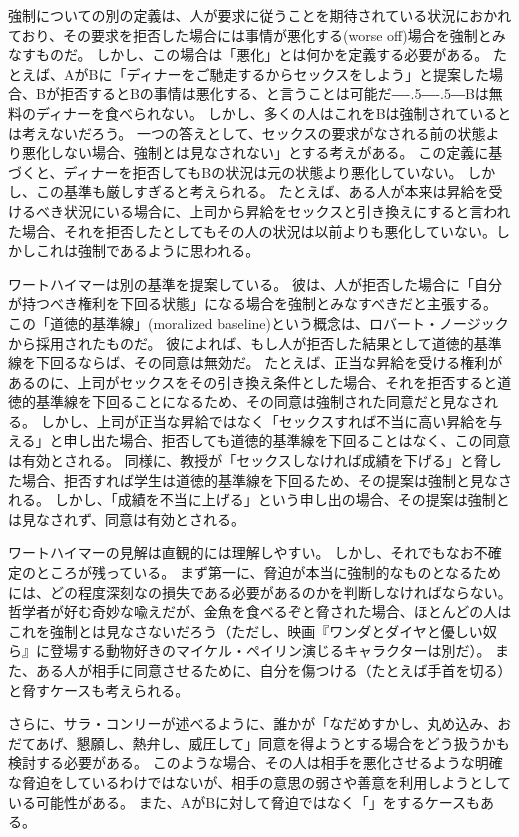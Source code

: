 \documentclass[paper=a4,book,openany]{jlreq}
\newcommand{\ig}[1]{}           %
\def\DDASH{―\kern-.5\zw―\kern-.5\zw―}
\begin{document}
強制についての別の定義は、人が要求に従うことを期待されている状況におかれており、その要求を拒否した場合には事情が悪化する(worse off)場合を強制とみなすものだ。
しかし、この場合は「悪化」とは何かを定義する必要がある。
たとえば、AがBに「ディナーをご馳走するからセックスをしよう」と提案した場合、Bが拒否するとBの事情は悪化する、と言うことは可能だ{\DDASH}Bは無料のディナーを食べられない。
しかし、多くの人はこれをBは強制されているとは考えないだろう。
一つの答えとして、セックスの要求がなされる前の状態より悪化しない場合、強制とは見なされない」とする考えがある。
この定義に基づくと、ディナーを拒否してもBの状況は元の状態より悪化していない。
しかし、この基準も厳しすぎると考えられる。
たとえば、ある人が本来は昇給を受けるべき状況にいる場合に、上司から昇給をセックスと引き換えにすると言われた場合、それを拒否したとしてもその人の状況は以前よりも悪化していない。しかしこれは強制であるように思われる。

ワートハイマーは別の基準を提案している。
彼は、人が拒否した場合に「自分が持つべき権利を下回る状態」になる場合を強制とみなすべきだと主張する。
この「道徳的基準線」(moralized baseline)という概念は、ロバート・ノージック\ig{Robert Nozick}から採用されたものだ。
彼によれば、もし人が拒否した結果として道徳的基準線を下回るならば、その同意は無効だ\citep[pp. 167--169]{wertheimer03:_consen_sexual_relat}。
たとえば、正当な昇給を受ける権利があるのに、上司がセックスをその引き換え条件とした場合、それを拒否すると道徳的基準線を下回ることになるため、その同意は強制された同意だと見なされる。
しかし、上司が正当な昇給ではなく「セックスすれば不当に高い昇給を与える」と申し出た場合、拒否しても道徳的基準線を下回ることはなく、この同意は有効とされる。
同様に、教授が「セックスしなければ成績を下げる」と脅した場合、拒否すれば学生は道徳的基準線を下回るため、その提案は強制と見なされる。
しかし、「成績を不当に上げる」という申し出の場合、その提案は強制とは見なされず、同意は有効とされる。

ワートハイマーの見解は直観的には理解しやすい。
しかし、それでもなお不確定のところが残っている。
まず第一に、脅迫が本当に強制的なものとなるためには、どの程度深刻なの損失である必要があるのかを判断しなければならない。
哲学者が好む奇妙な喩えだが、金魚を食べるぞと脅された場合、ほとんどの人はこれを強制とは見なさないだろう（ただし、映画『ワンダとダイヤと優しい奴ら』に登場する動物好きのマイケル・ペイリン演じるキャラクターは別だ）。
また、ある人が相手に同意させるために、自分を傷つける（たとえば手首を切る）と脅すケースも考えられる\citep[p.280]{husak06:_compl_guide_consen_sex}。

さらに、サラ・コンリーが述べるように、誰かが「なだめすかし、丸め込み、おだてあげ、懇願し、熱弁し、威圧して」同意を得ようとする場合をどう扱うかも検討する必要がある\citep[p.115]{conly04:seductionrapecoercion}。
このような場合、その人は相手を悪化させるような明確な脅迫をしているわけではないが、相手の意思の弱さや善意を利用しようとしている可能性がある。
また、AがBに対して脅迫ではなく「」をするケースもある。
\end{document}
